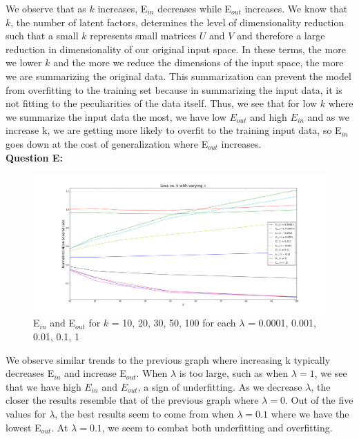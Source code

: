 \documentclass[12 pt]{article}
\begin{document}
	\noindent We observe that as $k$ increases, E$_{in}$ decreases while E$_{out}$ increases. We know that $k$, the number of latent factors, determines the level of dimensionality reduction such that a small $k$ represents small matrices $U$ and $V$ and therefore a large reduction in dimensionality of our original input space. In these terms, the more we lower $k$ and the more we reduce the dimensions of the input space, the more we are summarizing the original data. This summarization can prevent the model from overfitting to the training set because in summarizing the input data, it is not fitting to the peculiarities of the data itself. Thus, we see that for low $k$ where we summarize the input data the most, we have low $E_{out}$ and high $E_{in}$ and as we increase k, we are getting more likely to overfit to the training input data, so E$_{in}$ goes down at the cost of generalization where E$_{out}$ increases. \\

	
	\noindent\textbf{Question E:} \\
	
	\begin{figure}[H]
		\centering
		\includegraphics[width=\textwidth]{LossVsK}
		\caption{E$_{in}$ and E$_{out}$ for $k$ = 10, 20, 30, 50, 100 for each  $\lambda$ = 0.0001, 0.001, 0.01, 0.1, 1}
	\end{figure}

	\noindent We observe similar trends to the previous graph where increasing k typically decreases E$_{in}$ and increase E$_{out}$. When $\lambda$ is too large, such as when $\lambda = 1$, we see that we have high $E_{in}$ and $E_{out}$, a sign of underfitting. As we decrease $\lambda$, the closer the results resemble that of the previous graph where $\lambda = 0$. Out of the five values for $\lambda$, the best results seem to come from when $\lambda = 0.1$ where we have the lowest E$_{out}$. At $\lambda = 0.1$, we seem to combat both underfitting and overfitting.  
	
\end{document}
